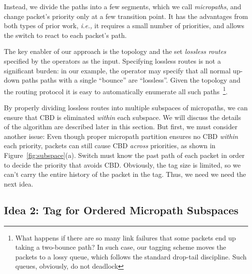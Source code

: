 Instead, we divide the paths into a few segments, which we call {\em micropaths},
and change packet's priority only at a few transition point. It has the
advantages from both types of prior work, {\em i.e.,} it requires a small number
of priorities, and allows the switch to react to each packet's path.

The key enabler of our approach is the topology and the set {\em lossless
routes} specified by the operators as the input. Specifying lossless routes is
not a significant burden: in our example, the operator may specify that all
normal up-down paths paths with a single ``bounce'' are ``lossless''. Given the
topology and the routing protocol it is easy to automatically enumerate all such
paths~\footnote{What happens if there are so many link failures that some
packets end up taking a two-bounce path? In such case, our tagging scheme moves
the packets to a lossy queue, which follows the standard drop-tail discipline.
Such queues, obviously, do not deadlock}. 

By properly dividing lossless routes into multiple subspaces of micropaths, we
can ensure that CBD is eliminated {\em within} each subspace. We will discuss
the details of the algorithm are described later in this section. But first, we
must consider another issue: Even though proper micropath partition ensures no
CBD {\em within} each priority, packets can still cause CBD {\em across}
priorities, as shown in Figure~\ref{fig:subspace}(a). Switch must know the past
path of each packet in order to decide the priority that avoids CBD. Obviously,
the tag size is limited, so we can't carry the entire history of the packet in
the tag. Thus, we need we need the next idea.


\subsection{Idea 2: Tag for Ordered Micropath Subspaces}\label{sec:tag_order}

